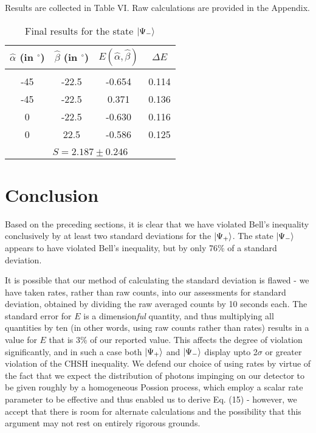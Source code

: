 \documentclass[aps,prl,nofootinbib,twocolumn,superscriptaddress,groupedaddress]{revtex4}  %
\begin{document}
Results are collected in Table VI. Raw calculations are provided in the Appendix.
\begin{table}[H]
\centering
\begin{tabular}{|c|c|c|c|}
\hline
$\hat{\alpha}$ (in $^{\circ}$) & $\hat{\beta}$ (in $^{\circ}$) & $E(\hat{\alpha},\hat{\beta})$ & $\Delta E$\\
\hline
\multicolumn{4}{|c|}{}\\[-2mm]
-45 & -22.5 & -0.654 & 0.114\\
-45 & -22.5 & 0.371 & 0.136\\
0 & -22.5 & -0.630 & 0.116\\
0 & 22.5 & -0.586 & 0.125 \\
\hline
\multicolumn{4}{|c|}{}\\[-2mm]
\multicolumn{4}{|c|}{$ S = 2.187 \pm 0.246 $}\\
\hline
\end{tabular}
\caption{Final results for the state $\ket{\Psi_{-}}$}
\end{table}

\section{Conclusion}
Based on the preceding sections, it is clear that we have violated Bell's inequality conclusively by at least two standard deviations for the $\ket{\Psi_{+}}$. The state $\ket{\Psi_{-}}$ appears to have violated Bell's inequality, but by only 76\% of a standard deviation.

It is possible that our method of calculating the standard deviation is flawed - we have taken rates, rather than raw counts, into our assessments for standard deviation, obtained by dividing the raw averaged counts by 10 seconds each. The standard error for $E$ is a dimension\textit{ful} quantity, and thus multiplying all quantities by ten (in other words, using raw counts rather than rates) results in a value for $E$ that is 3\% of our reported value. This affects the degree of violation significantly, and in such a case both $\ket{\Psi_{+}}$ and $\ket{\Psi_{-}}$ display upto 2$\sigma$ or greater violation of the CHSH inequality. We defend our choice of using rates by virtue of the fact that we expect the distribution of photons impinging on our detector to be given roughly by a homogeneous Possion process, which employ a scalar rate parameter to be effective and thus enabled us to derive Eq. (15) - however, we accept that there is room for alternate calculations and the possibility that this argument may not rest on entirely rigorous grounds.
\end{document}
